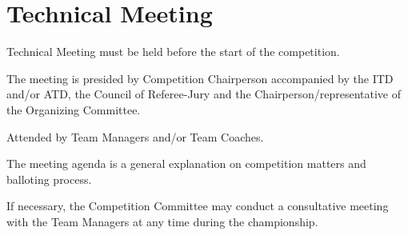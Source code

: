 \section{Technical Meeting}
\label{sec:technical_meeting}

\begin{legal}
\item Technical Meeting must be held before the start of the competition.
\item The meeting is presided by Competition Chairperson accompanied by the ITD and/or
ATD, the Council of Referee-Jury and the Chairperson/representative of the Organizing
Committee.
\item Attended by Team Managers and/or Team Coaches.
\item The meeting agenda is a general explanation on competition matters and balloting
process.
\item If necessary, the Competition Committee may conduct a consultative meeting with
the Team Managers at any time during the championship.
\end{legal}
